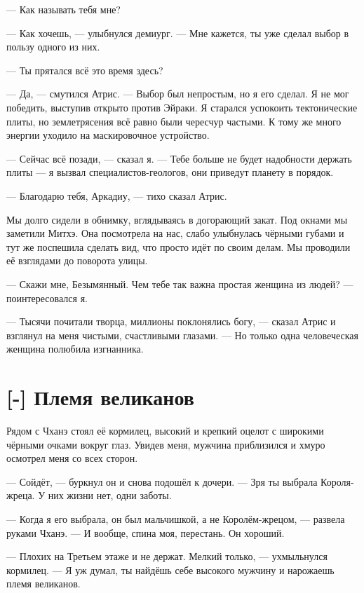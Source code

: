 --- Как называть тебя мне?

--- Как хочешь, --- улыбнулся демиург.
--- Мне кажется, ты уже сделал выбор в пользу одного из них.

--- Ты прятался всё это время здесь?

--- Да, --- смутился Атрис.
--- Выбор был непростым, но я его сделал.
Я не мог победить, выступив открыто против Эйраки.
Я старался успокоить тектонические плиты, но землетрясения всё равно были чересчур частыми.
К тому же много энергии уходило на маскировочное устройство.

--- Сейчас всё позади, --- сказал я.
--- Тебе больше не будет надобности держать плиты --- я вызвал специалистов-геологов, они приведут планету в порядок.

--- Благодарю тебя, Аркадиу, --- тихо сказал Атрис.

Мы долго сидели в обнимку, вглядываясь в догорающий закат.
Под окнами мы заметили Митхэ.
Она посмотрела на нас, слабо улыбнулась чёрными губами и тут же поспешила сделать вид, что просто идёт по своим делам.
Мы проводили её взглядами до поворота улицы.

--- Скажи мне, Безымянный.
Чем тебе так важна простая женщина из людей? --- поинтересовался я.

--- Тысячи почитали творца, миллионы поклонялись богу, --- сказал Атрис и взглянул на меня чистыми, счастливыми глазами.
--- Но только одна человеческая женщина полюбила изгнанника.

\section{[-] Племя великанов}

\textspace

Рядом с Чханэ стоял её кормилец, высокий и крепкий оцелот с широкими чёрными очками вокруг глаз.
Увидев меня, мужчина приблизился и хмуро осмотрел меня со всех сторон.

--- Сойдёт, --- буркнул он и снова подошёл к дочери.
--- Зря ты выбрала Короля-жреца.
У них жизни нет, одни заботы.

--- Когда я его выбрала, он был мальчишкой, а не Королём-жрецом, --- развела руками Чханэ.
--- И вообще, спина моя, перестань.
Он хороший.

--- Плохих на Третьем этаже и не держат.
Мелкий только, --- ухмыльнулся кормилец.
--- Я уж думал, ты найдёшь себе высокого мужчину и нарожаешь племя великанов.

\textspace


